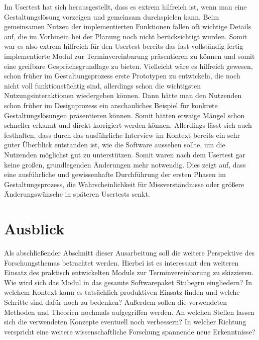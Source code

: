 Im Usertest hat sich herausgestellt, dass es extrem hilfreich ist, wenn man
eine Gestaltungslösung vorzeigen und gemeinsam durchspielen kann. Beim
gemeinsamen Nutzen der implementierten Funktionen fallen oft wichtige Details
auf, die im Vorhinein bei der Planung noch nicht berücksichtigt wurden. Somit
war es also extrem hilfreich für den Usertest bereits das fast vollständig
fertig implementierte Modul zur Terminvereinbarung präsentieren zu können und
somit eine greifbare Gesprächsgrundlage zu bieten. Vielleicht wäre es hilfreich
gewesen, schon früher im Gestaltungsprozess erste Prototypen zu entwickeln, die
noch nicht voll funktionstüchtig sind, allerdings schon die wichtigsten
Nutzungsinteraktionen wiedergeben können. Dann hätte man den Nutzenden schon
früher im Designprozess ein anschauliches Beispiel für konkrete
Gestaltungslösungen präsentieren können. Somit hätten etwaige Mängel schon
schneller erkannt und direkt korrigiert werden können. Allerdings lässt sich
auch festhalten, dass durch das ausführliche Interview im Kontext bereits ein
sehr guter Überblick entstanden ist, wie die Software aussehen sollte, um die
Nutzenden möglichst gut zu unterstützen. Somit waren nach dem Usertest gar
keine großen, grundlegenden Änderungen mehr notwendig. Dies zeigt auf, dass
eine ausführliche und gewissenhafte Durchführung der ersten Phasen im
Gestaltungsprozess, die Wahrscheinlichkeit für Missverständnisse oder größere
Änderungswünsche in späteren Usertests senkt.

\section{Ausblick}
\label{subsection:outlook}

Als abschließender Abschnitt dieser Ausarbeitung soll die weitere Perspektive
des Forschungsthemas betrachtet werden. Hierbei ist es interessant den weiteren
Einsatz des praktisch entwickelten Moduls zur Terminvereinbarung zu skizzieren.
Wie wird sich das Modul in das gesamte Softwarepaket Stubegru eingliedern? In
welchem Kontext kann es tatsächlich produktiven Einsatz finden und welche
Schritte sind dafür noch zu bedenken? Außerdem sollen die verwendeten Methoden
und Theorien nochmals aufgegriffen werden. An welchen Stellen lassen sich die
verwendeten Konzepte eventuell noch verbessern? In welcher Richtung verspricht
eine weitere wissenschaftliche Forschung spannende neue Erkenntnisse?

